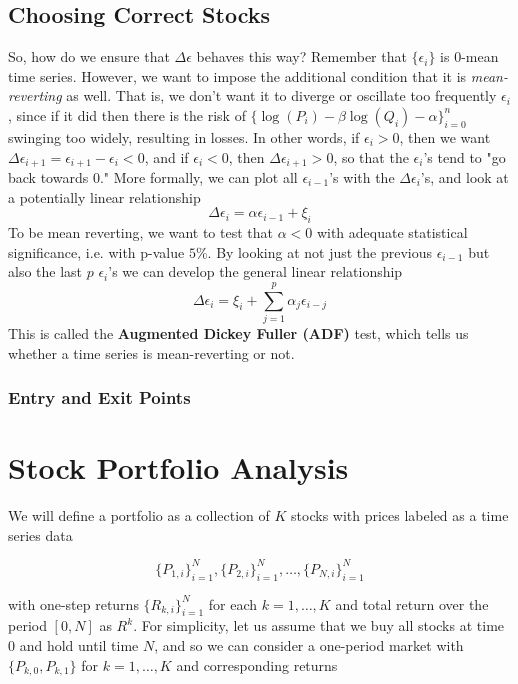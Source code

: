 \documentclass{article}
\begin{document}
  \subsection{Choosing Correct Stocks}

    So, how do we ensure that $\Delta \epsilon$ behaves this way? Remember that $\{\epsilon_i\}$ is $0$-mean time series. However, we want to impose the additional condition that it is \textit{mean-reverting} as well. That is, we don't want it to diverge or oscillate too frequently $\epsilon_i$, since if it did then there is the risk of $\{\log(P_i) - \beta \log(Q_i) - \alpha\}_{i=0}^n$ swinging too widely, resulting in losses. In other words, if $\epsilon_i > 0$, then we want $\Delta \epsilon_{i + 1} = \epsilon_{i+1} - \epsilon_i < 0$, and if $\epsilon_i < 0$, then $\Delta \epsilon_{i+1} > 0$, so that the $\epsilon_i$'s tend to "go back towards $0$." More formally, we can plot all $\epsilon_{i-1}$'s with the $\Delta \epsilon_i$'s, and look at a potentially linear relationship 
    \[\Delta \epsilon_i = \alpha \epsilon_{i-1} + \xi_i\]
    To be mean reverting, we want to test that $\alpha < 0$ with adequate statistical significance, i.e. with p-value $5\%$. By looking at not just the previous $\epsilon_{i-1}$ but also the last $p$ $\epsilon_i$'s we can develop the general linear relationship 
    \[\Delta \epsilon_i = \xi_i + \sum_{j=1}^p \alpha_j \epsilon_{i - j}\]
    This is called the \textbf{Augmented Dickey Fuller (ADF)} test, which tells us whether a time series is mean-reverting or not. 

  \subsubsection{Entry and Exit Points}

\section{Stock Portfolio Analysis}

  We will define a portfolio as a collection of $K$ stocks with prices labeled as a time series data 
  
  \begin{equation}
    \{P_{1,i}\}_{i=1}^N, \{P_{2,i}\}_{i = 1}^N, \ldots, \{P_{N,i}\}_{i=1}^N
  \end{equation}

  with one-step returns $\{R_{k, i}\}_{i = 1}^{N}$ for each $k = 1, \ldots, K$ and total return over the period $[0, N]$ as $R^k$. For simplicity, let us assume that we buy all stocks at time $0$ and hold until time $N$, and so we can consider a one-period market with $\{P_{k, 0}, P_{k, 1}\}$ for $k = 1, \ldots, K$ and corresponding returns 
\end{document}
